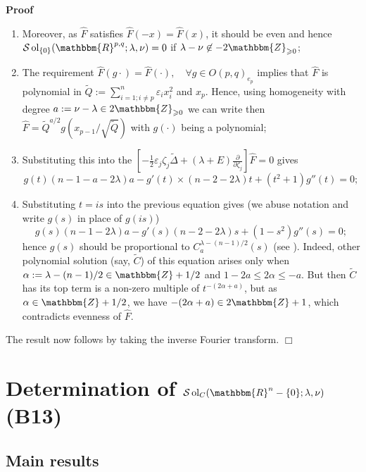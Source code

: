 \documentclass{article}
\newcommand{\assign}{:=}
\newcommand{\nin}{\not\in}
\newcommand{\tmop}[1]{\ensuremath{\operatorname{#1}}}
\renewenvironment{proof}{\noindent\textbf{Proof\ }}{\hspace*{\fill}$\Box$\medskip}
\theoremstyle{remark}
\begin{document}
\begin{proof}
\begin{enumerate}
    \item Moreover, as $\hat{F}$ satisfies $\hat{F} (- x) = \hat{F} (x)$, it
    should be even and hence $\mathcal{S} \tmop{ol}_{\{ 0 \}} (\mathbbm{R}^{p,
    q} ; \lambda, \nu) = 0$ if $\lambda - \nu \nin - 2\mathbbm{Z}_{\geqslant
    0}$;
    
    \item The requirement $\hat{F} (g \cdot) = \hat{F} (\cdot), \quad \forall
    g \in O (p, q)_{e_p}$ implies that $\hat{F}$ is polynomial in $\tilde{Q}
    \assign \sum_{i = 1 ; i \neq p}^n \varepsilon_i x_i^2$ and $x_p$. Hence,
    using homogeneity with degree $a \assign \nu - \lambda \in
    2\mathbbm{Z}_{\geqslant 0}$ we can write then $\hat{F} = \tilde{Q}^{a / 2}
    g \left( x_{p - 1} / \sqrt{\tilde{Q}} \right)$ with $g (\cdot)$ being a
    polynomial;
    
    \item Substituting this into the $\left[ - \frac{1}{2} \varepsilon_j
    \zeta_j \tilde{\Delta} + (\lambda + E) \frac{\partial}{\partial \zeta_j}
    \right] \hat{F} = 0$ gives
    \[ g (t) (n - 1 - a - 2 \lambda) a - g' (t) \times (n - 2 - 2 \lambda) t
       + (t^2 + 1) g'' (t) = 0 ; \]
    \item Substituting $t = i s$ into the previous equation gives (we abuse
    notation and write $g (s)$ in place of $g (i s)$)
    \[ g (s) (n - 1 - 2 \lambda) a - g' (s) (n - 2 - 2 \lambda) s + (1 - s^2)
       g'' (s) = 0 ; \]
    hence $g (s)$ should be proportional to $C^{\lambda - (n - 1) / 2}_a (s)$
    (see {\cite[thm. 11.4]{kobayashi2015differential2}}). Indeed, other
    polynomial solution (say, $\tilde{C}$) of this equation arises only when
    $\alpha \assign \lambda - (n - 1) / 2 \in \mathbbm{Z}+ 1 / 2$ and $1 - 2 a
    \leqslant 2 \alpha \leqslant - a$. But then $\tilde{C}$ has its top term
    is a non-zero multiple of $t^{- (2 \alpha + a)}$, but as $\alpha \in
    \mathbbm{Z}+ 1 / 2$, we have $- (2 \alpha + a) \in 2\mathbbm{Z}+ 1$, which
    contradicts evenness of $\hat{F}$.
  \end{enumerate}
  The result now follows by taking the inverse Fourier transform.
\end{proof}

\section{Determination of $\mathcal{S} \tmop{ol}_C (\mathbbm{R}^n - \{ 0 \} ;
\lambda, \nu)$ (B13)}\label{sec:uniq-c}

\subsection{Main results}
\end{document}
